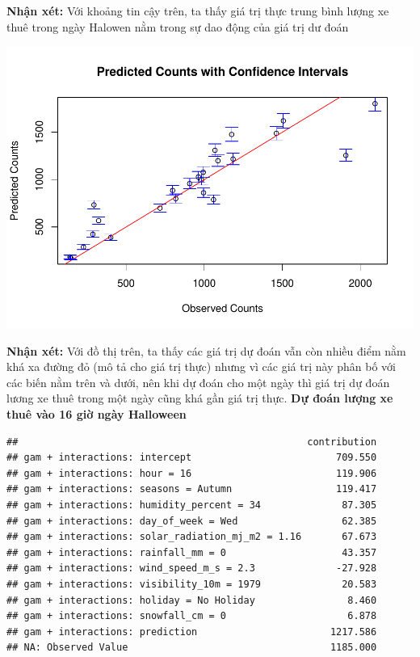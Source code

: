 \documentclass[
  11pt,
  letterpaper,
]{article}
\begin{document}
\textbf{Nhận xét:} Với khoảng tin cậy trên, ta thấy giá trị thực trung bình lượng xe thuê trong ngày Halowen nằm trong sự dao động của giá trị dư đoán

\begin{center}\includegraphics[width=1.2\linewidth,]{Final_Project_files/figure-latex/unnamed-chunk-47-1} \end{center}

\textbf{Nhận xét:} Với đồ thị trên, ta thấy các giá trị dự đoán vẫn còn nhiều điểm nằm khá xa đường đỏ (mô tả cho giá trị thực) nhưng vì các giá trị này phân bố với các biến nằm trên và dưới, nên khi dự đoán cho một ngày thì giá trị dự đoán lương xe thuê trong một ngày cũng khá gần giá trị thực.
\textbf{Dự đoán lượng xe thuê vào 16 giờ ngày Halloween}

\begin{verbatim}
##                                                  contribution
## gam + interactions: intercept                         709.550
## gam + interactions: hour = 16                         119.906
## gam + interactions: seasons = Autumn                  119.417
## gam + interactions: humidity_percent = 34              87.305
## gam + interactions: day_of_week = Wed                  62.385
## gam + interactions: solar_radiation_mj_m2 = 1.16       67.673
## gam + interactions: rainfall_mm = 0                    43.357
## gam + interactions: wind_speed_m_s = 2.3              -27.928
## gam + interactions: visibility_10m = 1979              20.583
## gam + interactions: holiday = No Holiday                8.460
## gam + interactions: snowfall_cm = 0                     6.878
## gam + interactions: prediction                       1217.586
## NA: Observed Value                                   1185.000
\end{verbatim}
\end{document}
